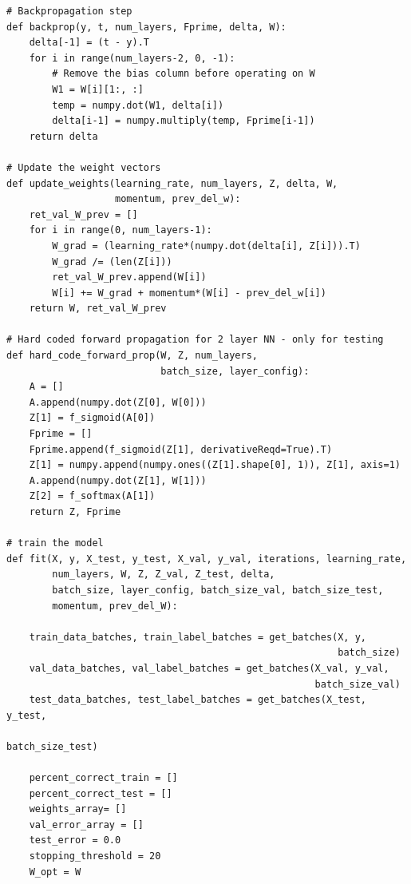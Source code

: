 \documentclass{article}
\begin{document}
\begin{lstlisting}
# Backpropagation step
def backprop(y, t, num_layers, Fprime, delta, W):
    delta[-1] = (t - y).T
    for i in range(num_layers-2, 0, -1):
        # Remove the bias column before operating on W
        W1 = W[i][1:, :]
        temp = numpy.dot(W1, delta[i])
        delta[i-1] = numpy.multiply(temp, Fprime[i-1])
    return delta

# Update the weight vectors
def update_weights(learning_rate, num_layers, Z, delta, W, 
                   momentum, prev_del_w):
    ret_val_W_prev = []
    for i in range(0, num_layers-1):
        W_grad = (learning_rate*(numpy.dot(delta[i], Z[i])).T)
        W_grad /= (len(Z[i]))
        ret_val_W_prev.append(W[i])
        W[i] += W_grad + momentum*(W[i] - prev_del_w[i])
    return W, ret_val_W_prev

# Hard coded forward propagation for 2 layer NN - only for testing 
def hard_code_forward_prop(W, Z, num_layers, 
                           batch_size, layer_config):
    A = []
    A.append(numpy.dot(Z[0], W[0]))
    Z[1] = f_sigmoid(A[0])
    Fprime = []
    Fprime.append(f_sigmoid(Z[1], derivativeReqd=True).T)
    Z[1] = numpy.append(numpy.ones((Z[1].shape[0], 1)), Z[1], axis=1)
    A.append(numpy.dot(Z[1], W[1]))
    Z[2] = f_softmax(A[1])
    return Z, Fprime

# train the model
def fit(X, y, X_test, y_test, X_val, y_val, iterations, learning_rate, 
        num_layers, W, Z, Z_val, Z_test, delta,   
        batch_size, layer_config, batch_size_val, batch_size_test,
        momentum, prev_del_W):
            
    train_data_batches, train_label_batches = get_batches(X, y, 
                                                          batch_size)        
    val_data_batches, val_label_batches = get_batches(X_val, y_val, 
                                                      batch_size_val)
    test_data_batches, test_label_batches = get_batches(X_test, y_test, 
                                                       batch_size_test)
    
    percent_correct_train = []    
    percent_correct_test = []    
    weights_array= []
    val_error_array = []
    test_error = 0.0
    stopping_threshold = 20
    W_opt = W    
    

\end{lstlisting}
\end{document}
